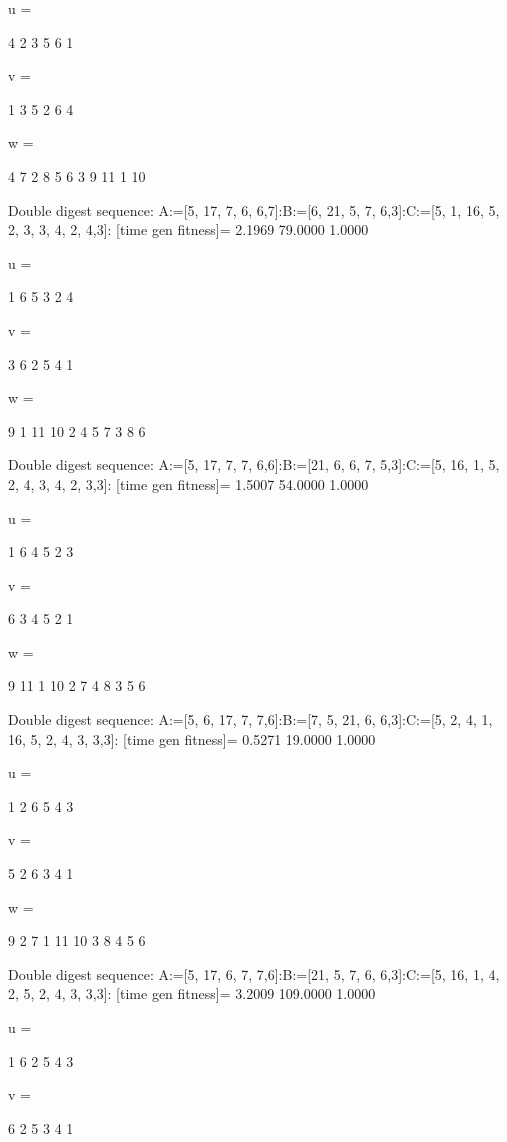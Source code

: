 u =

     4     2     3     5     6     1


v =

     1     3     5     2     6     4


w =

     4     7     2     8     5     6     3     9    11     1    10

Double digest sequence:
A:=[5, 17, 7, 6, 6,7]:B:=[6, 21, 5, 7, 6,3]:C:=[5, 1, 16, 5, 2, 3, 3, 4, 2, 4,3]:
[time gen fitness]=
    2.1969   79.0000    1.0000


u =

     1     6     5     3     2     4


v =

     3     6     2     5     4     1


w =

     9     1    11    10     2     4     5     7     3     8     6

Double digest sequence:
A:=[5, 17, 7, 7, 6,6]:B:=[21, 6, 6, 7, 5,3]:C:=[5, 16, 1, 5, 2, 4, 3, 4, 2, 3,3]:
[time gen fitness]=
    1.5007   54.0000    1.0000


u =

     1     6     4     5     2     3


v =

     6     3     4     5     2     1


w =

     9    11     1    10     2     7     4     8     3     5     6

Double digest sequence:
A:=[5, 6, 17, 7, 7,6]:B:=[7, 5, 21, 6, 6,3]:C:=[5, 2, 4, 1, 16, 5, 2, 4, 3, 3,3]:
[time gen fitness]=
    0.5271   19.0000    1.0000


u =

     1     2     6     5     4     3


v =

     5     2     6     3     4     1


w =

     9     2     7     1    11    10     3     8     4     5     6

Double digest sequence:
A:=[5, 17, 6, 7, 7,6]:B:=[21, 5, 7, 6, 6,3]:C:=[5, 16, 1, 4, 2, 5, 2, 4, 3, 3,3]:
[time gen fitness]=
    3.2009  109.0000    1.0000


u =

     1     6     2     5     4     3


v =

     6     2     5     3     4     1


